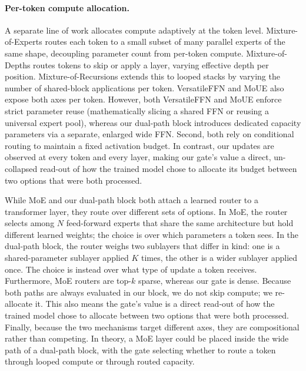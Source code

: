 \documentclass[11pt]{article}
\begin{document}
\paragraph{Per-token compute allocation.}
A separate line of work allocates compute adaptively at the token level. Mixture-of-Experts \citep{shazeer-etal-2017-moe, fedus-etal-2022-switch} routes each token to a small subset of many parallel experts of the same shape, decoupling parameter count from per-token compute. Mixture-of-Depths \citep{raposo-etal-2024-mod} routes tokens to skip or apply a layer, varying effective depth per position. Mixture-of-Recursions \citep{bae-etal-2025-mor} extends this to looped stacks by varying the number of shared-block applications per token. VersatileFFN \citep{nie2025versatileffn} and MoUE \citep{chen2026mixture} also expose both axes per token. However, both VersatileFFN and MoUE enforce strict parameter reuse (mathematically slicing a shared FFN or reusing a universal expert pool), whereas our dual-path block introduces dedicated capacity parameters via a separate, enlarged wide FFN. Second, both rely on conditional routing to maintain a fixed activation budget. In contrast, our updates are observed at every token and every layer, making our gate's value a direct, un-collapsed read-out of how the trained model chose to allocate its budget between two options that were both processed. 

While MoE and our dual-path block both attach a learned router to a transformer layer, they route over different sets of options. In MoE, the router selects among $N$ feed-forward experts that share the same architecture but hold different learned weights; the choice is over which parameters a token sees. In the dual-path block, the router weighs two sublayers that differ in kind: one is a shared-parameter sublayer applied $K$ times, the other is a wider sublayer applied once. The choice is instead over what type of update a token receives. Furthermore, MoE routers are top-$k$ sparse, whereas our gate is dense. Because both paths are always evaluated in our block, we do not skip compute; we re-allocate it. This also means the gate's value is a direct read-out of how the trained model chose to allocate between two options that were both processed. Finally, because the two mechanisms target different axes, they are compositional rather than competing. In theory, a MoE layer could be placed inside the wide path of a dual-path block, with the gate selecting whether to route a token through looped compute or through routed capacity.
\end{document}

